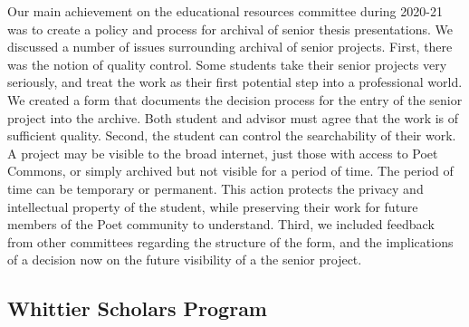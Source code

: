 \documentclass[../../../main.tex]{subfiles}
\begin{document}
Our main achievement on the educational resources committee during 2020-21 was to create a policy and process for archival of senior thesis presentations.  We discussed a number of issues surrounding archival of senior projects.  First, there was the notion of quality control.  Some students take their senior projects very seriously, and treat the work as their first potential step into a professional world.  We created a form that documents the decision process for the entry of the senior project into the archive.  Both student and advisor must agree that the work is of sufficient quality.  Second, the student can control the searchability of their work.  A project may be visible to the broad internet, just those with access to Poet Commons, or simply archived but not visible for a period of time.  The period of time can be temporary or permanent.  This action protects the privacy and intellectual property of the student, while preserving their work for future members of the Poet community to understand.  Third, we included feedback from other committees regarding the structure of the form, and the implications of a decision now on the future visibility of a the senior project.

\subsection{Whittier Scholars Program}
\end{document}
